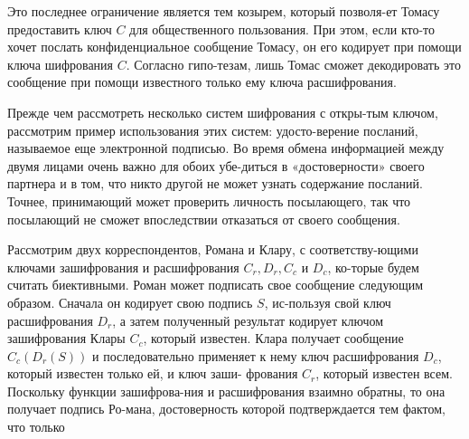 \documentclass{mai_book}
\begin{document}
\rule{0pt}{18pt}
 Это последнее ограничение является тем козырем, который 
позволя-\linebreak ет Томасу предоставить ключ $C$ для общественного пользования. При\linebreak
этом, если кто-то хочет послать конфиденциальное сообщение Томасу,\linebreak
он его кодирует при помощи ключа шифрования $C$. Согласно 
гипо-\linebreak тезам, лишь Томас сможет декодировать это сообщение при помощи\linebreak
известного только ему ключа расшифрования.\par
 Прежде чем рассмотреть несколько систем шифрования с 
откры-\linebreak тым ключом, рассмотрим пример использования этих систем: 
удосто-\linebreak верение посланий, называемое еще электронной подписью. Во время\linebreak
обмена информацией между двумя лицами очень важно для обоих 
убе-\linebreak диться в «достоверности» своего партнера и в том, что никто другой \linebreak
не может узнать содержание посланий. Точнее, принимающий может\linebreak
проверить личность посылающего, так что посылающий не сможет 
впоследствии отказаться от своего сообщения.\par
 Рассмотрим двух корреспондентов, Романа и Клару, с 
соответству-\linebreak ющими ключами зашифрования и расшифрования $C_r , D_r , C_c$ и $D_c$, ко-\linebreak торые будем считать биективными. Роман может подписать свое 
сообщение следующим образом. Сначала он кодирует свою подпись $S$, 
ис-\linebreak пользуя свой ключ расшифрования $D_r$, а затем полученный результат
кодирует ключом зашифрования Клары $C_c$, который известен. Клара \linebreak
получает сообщение $C_c(D_r(S))$ и последовательно применяет к нему \linebreak
ключ расшифрования $D_c$, который известен только ей, и ключ 
заши- \linebreak фрования $C_r$, который известен всем. Поскольку функции 
зашифрова-\linebreak ния и расшифрования взаимно обратны, то она получает подпись 
Ро-\linebreak мана, достоверность которой подтверждается тем фактом, что только\linebreak
\end{document}
